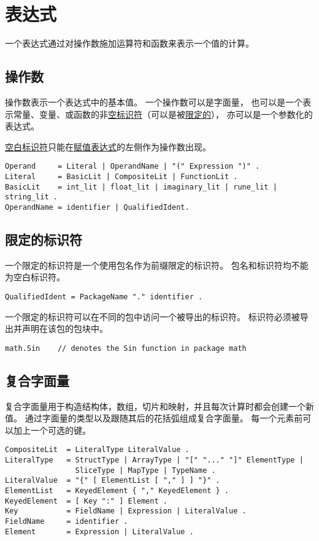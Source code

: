 \chapter{表达式}
一个表达式通过对操作数施加运算符和函数来表示一个值的计算。

\section{操作数} \label{sec:operands}
操作数表示一个表达式中的基本值。
一个操作数可以是字面量，
也可以是一个表示常量、变量、或函数的非\hyperref[sec:blank identifier]{空标识符}（可以是被\hyperref[sec:qualified identifiers]{限定的}），
亦可以是一个参数化的表达式。

\hyperref[sec:blank identifier]{空白标识符}只能在\hyperref[sec:assignments]{赋值表达式}的左侧作为操作数出现。
\begin{lstlisting}[style=EBNF]
Operand     = Literal | OperandName | "(" Expression ")" .
Literal     = BasicLit | CompositeLit | FunctionLit .
BasicLit    = int_lit | float_lit | imaginary_lit | rune_lit | string_lit .
OperandName = identifier | QualifiedIdent.
\end{lstlisting}

\section{限定的标识符} \label{sec:qualified identifiers}
一个限定的标识符是一个使用包名作为前缀限定的标识符。
包名和标识符均不能为空白标识符。
\begin{lstlisting}[style=EBNF]
QualifiedIdent = PackageName "." identifier .
\end{lstlisting}
一个限定的标识符可以在不同的包中访问一个被导出的标识符。
标识符必须被导出并声明在该包的包块中。
\begin{lstlisting}[style=golang]
math.Sin	// denotes the Sin function in package math
\end{lstlisting}

\section{复合字面量}
复合字面量用于构造结构体，数组，切片和映射，并且每次计算时都会创建一个新值。
通过字面量的类型以及跟随其后的花括弧组成复合字面量。
每一个元素前可以加上一个可选的键。
\begin{lstlisting}[style=EBNF]
CompositeLit  = LiteralType LiteralValue .
LiteralType   = StructType | ArrayType | "[" "..." "]" ElementType |
                SliceType | MapType | TypeName .
LiteralValue  = "{" [ ElementList [ "," ] ] "}" .
ElementList   = KeyedElement { "," KeyedElement } .
KeyedElement  = [ Key ":" ] Element .
Key           = FieldName | Expression | LiteralValue .
FieldName     = identifier .
Element       = Expression | LiteralValue .
\end{lstlisting}

